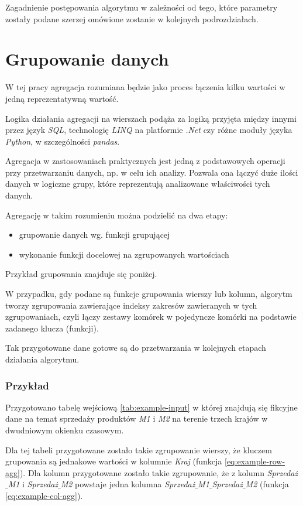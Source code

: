 \documentclass[brudnopis]{xmgr}
\begin{document}
Zagadnienie postępowania algorytmu w zależności od tego, które parametry zostały podane szerzej omówione zostanie w kolejnych podrozdziałach.

\section{Grupowanie danych}

W tej pracy agregacja rozumiana będzie jako proces łączenia kilku wartości w jedną reprezentatywną wartość.

Logika działania agregacji na wierszach podąża za logiką przyjęta między innymi przez język \emph{SQL}, technologię \emph{LINQ} na platformie \emph{.Net} czy różne moduły języka \emph{Python}, w szczególności \emph{pandas}.

Agregacja w zastosowaniach praktycznych jest jedną z podstawowych operacji przy przetwarzaniu danych, np. w celu ich analizy.
Pozwala ona łączyć duże ilości danych w logiczne grupy, które reprezentują analizowane właściwości tych danych.

Agregację w takim rozumieniu można podzielić na dwa etapy:
\begin{itemize}
    \item grupowanie danych wg. funkcji grupującej
    \item wykonanie funkcji docelowej na zgrupowanych wartościach
\end{itemize}{}

Przykład grupowania znajduje się poniżej.

W przypadku, gdy podane są funkcje grupowania wierszy lub kolumn, algorytm tworzy zgrupowania zawierające indeksy zakresów zawieranych w tych zgrupowaniach, czyli łączy zestawy komórek w pojedyncze komórki na podstawie zadanego klucza (funkcji).

Tak przygotowane dane gotowe są do przetwarzania w kolejnych etapach działania algorytmu.

\newpage
\subsubsection{Przykład}

Przygotowano tabelę wejściową \ref{tab:example-input} w której znajdują się fikcyjne dane na temat sprzedaży produktów \emph{M1} i \emph{M2} na terenie trzech krajów w dwudniowym okienku czasowym.

Dla tej tabeli przygotowane zostało takie zgrupowanie wierszy, że kluczem grupowania są jednakowe wartości w kolumnie \emph{Kraj} (funkcja \ref{eq:example-row-agg}).
Dla kolumn przygotowane zostało takie zgrupowanie, że z kolumn \emph{Sprzedaż$\_$M1} i \emph{Sprzedaż$\_$M2} powstaje jedna kolumna \emph{Sprzedaż$\_$M1$\_$Sprzedaż$\_$M2} (funkcja \ref{eq:example-col-agg}).
\end{document}
